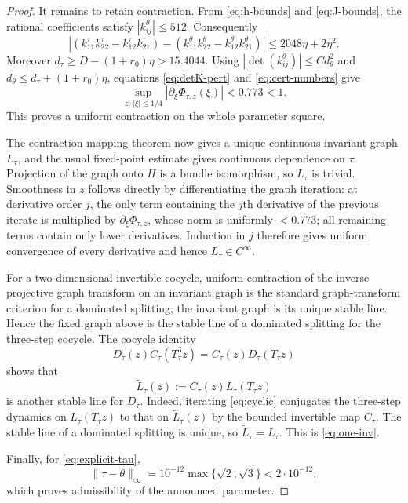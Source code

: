 \documentclass[10pt,a4paper]{amsart}
\begin{document}
\begin{proof}
It remains to retain contraction.  From \eqref{eq:h-bounds} and
\eqref{eq:J-bounds}, the rational coefficients satisfy
$|k_{ij}^\theta|\le512$.  Consequently
\begin{equation}\label{eq:detK-pert}
 \left|
 (k_{11}^\tau k_{22}^\tau-k_{12}^\tau k_{21}^\tau)
 -(k_{11}^\theta k_{22}^\theta-k_{12}^\theta k_{21}^\theta)
 \right|
 \le2048\eta+2\eta^2.
\end{equation}
Moreover
$d_\tau\ge D-(1+r_0)\eta>15.4044$.  Using
$|\det(k_{ij}^\theta)|\le C d_\theta^2$ and
$d_\theta\le d_\tau+(1+r_0)\eta$, equations
\eqref{eq:detK-pert} and \eqref{eq:cert-numbers} give
\begin{equation}\label{eq:pert-contraction}
 \sup_{z,\,|\xi|\le1/4}|\partial_\xi\Phi_{\tau,z}(\xi)|<0.773<1.
\end{equation}
This proves a uniform contraction on the whole parameter square.

The contraction mapping theorem now gives a unique continuous invariant graph
$L_\tau$, and the usual fixed-point estimate gives continuous dependence on
$\tau$.  Projection of the graph onto $H$ is a bundle isomorphism, so
$L_\tau$ is trivial.  Smoothness in $z$ follows directly by differentiating
the graph iteration: at derivative order $j$, the only term containing the
$j$th derivative of the previous iterate is multiplied by
$\partial_\xi\Phi_{\tau,z}$, whose norm is uniformly $<0.773$; all remaining
terms contain only lower derivatives.  Induction in $j$ therefore gives
uniform convergence of every derivative and hence $L_\tau\in C^\infty$.

For a two-dimensional invertible cocycle, uniform contraction of the inverse
projective graph transform on an invariant graph is the standard graph-transform
criterion for a dominated splitting; the invariant graph is its unique stable
line.  Hence the fixed graph above is the stable line of a dominated splitting
for the three-step cocycle.  The cocycle identity
\begin{equation}\label{eq:cyclic}
 D_\tau(z)C_\tau(T_\tau^3z)=C_\tau(z)D_\tau(T_\tau z)
\end{equation}
shows that
\[
 \widetilde L_\tau(z):=C_\tau(z)L_\tau(T_\tau z)
\]
is another stable line for $D_\tau$.  Indeed, iterating
\eqref{eq:cyclic} conjugates the three-step dynamics on
$L_\tau(T_\tau z)$ to that on $\widetilde L_\tau(z)$ by the bounded invertible
map $C_\tau$.  The stable line of a dominated splitting is unique, so
$\widetilde L_\tau=L_\tau$.  This is \eqref{eq:one-inv}.

Finally, for \eqref{eq:explicit-tau},
\[
 \|\tau-\theta\|_\infty
 =10^{-12}\max\{\sqrt2,\sqrt3\}
 <2\cdot10^{-12},
\]
which proves admissibility of the announced parameter.
\end{proof}
\end{document}
